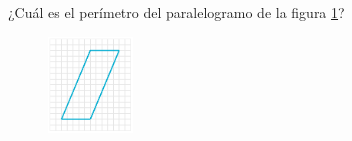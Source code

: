 
¿Cuál es el perímetro del paralelogramo de la figura \ref{fig:peri_paralelogramo_03}?

\begin{figure}[H]
    \centering
    \includegraphics[width=0.2\textwidth]{../images/peri_paralelogramo_03.png}
    \caption{}
    \label{fig:peri_paralelogramo_03}
\end{figure}
